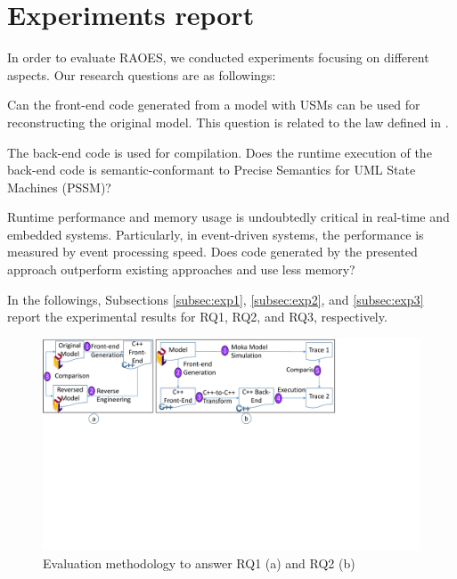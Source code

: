\section{Experiments report}
\label{sec:exp}

In order to evaluate RAOES, we conducted experiments focusing on different aspects. 
Our research questions are as followings:
\begin{description}[\footnotesize]
	\item[\tb{RQ1}] %
	Can the front-end code generated from a model with USMs can be used for reconstructing the original model. This question is related to the  law defined in \cite{foster_combinators_2007}.
	
	\item[\tb{RQ2}] The back-end code is used for compilation. 
	Does the runtime execution of the back-end code is semantic-conformant to Precise Semantics for UML State Machines (PSSM)? 
	
	\item[\tb{RQ3}] Runtime performance and memory usage is undoubtedly critical in real-time and embedded systems. Particularly, in event-driven systems, the performance is measured by event processing speed. Does code generated by the presented approach outperform existing approaches and use less memory?
\end{description} 


In the followings, Subsections \ref{subsec:exp1}, \ref{subsec:exp2}, and \ref{subsec:exp3} report the experimental results for RQ1, RQ2, and RQ3, respectively.

\begin{figure}
	\centering
	\includegraphics[clip, trim=0cm 11.4cm 7.65cm 0cm, width=\columnwidth]{figures/rq1-2evaluation}
	\caption{Evaluation methodology to answer RQ1 (a) and RQ2 (b)} 
	\label{fig:rq1-2evaluation}
\end{figure}

